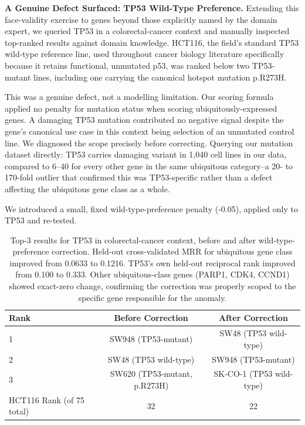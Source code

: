 \documentclass[author={Karen Coutinho, Ishaan Bhalla, Aman Raj, Dixit Kaloorani Malarmannan},
                supervisor={Dr. Daniel D'Andrea},
                degree={MSc},
                title={CellSelector Omics: A Multi-Omics Recommendation System for Cell Line Selection},
                subtitle={},
                type={},
                year={2026}]{dissertation}
\begin{document}
{\bf A Genuine Defect Surfaced: TP53 Wild-Type Preference.} Extending this face-validity exercise to genes beyond those explicitly named by the domain expert, we queried TP53 in a colorectal-cancer context and manually inspected top-ranked results against domain knowledge. HCT116, the field's standard TP53 wild-type reference line, used throughout cancer biology literature specifically because it retains functional, unmutated p53, was ranked below two TP53-mutant lines, including one carrying the canonical hotspot mutation p.R273H.

This was a genuine defect, not a modelling limitation. Our scoring formula applied no penalty for mutation status when scoring ubiquitously-expressed genes. A damaging TP53 mutation contributed no negative signal despite the gene's canonical use case in this context being selection of an unmutated control line. We diagnosed the scope precisely before correcting. Querying our mutation dataset directly: TP53 carries damaging variant in 1,040 cell lines in our data, compared to 6–40 for every other gene in the same ubiquitous category--a 20- to 170-fold outlier that confirmed this was TP53-specific rather than a defect affecting the ubiquitous gene class as a whole.



We introduced a small, fixed wild-type-preference penalty (-0.05), applied only to TP53 and re-tested.

\begin{table}[t]
\centering
\begin{tabular}{|l|c|c|}
\hline
{\bf Rank} & {\bf Before Correction} & {\bf After Correction} \\
\hline
1 & SW948 (TP53-mutant) & SW48 (TP53 wild-type) \\
2 & SW48 (TP53 wild-type) & SW948 (TP53-mutant) \\
3 & SW620 (TP53-mutant, p.R273H) & SK-CO-1 (TP53 wild-type) \\
HCT116 Rank (of 75 total) & 32 & 22 \\
\hline
\end{tabular}
\caption{Top-3 results for TP53 in colorectal-cancer context, before and after wild-type-preference correction. Held-out cross-validated MRR for ubiquitous gene class improved from 0.0633 to 0.1216. TP53's own held-out reciprocal rank improved from 0.100 to 0.333. Other ubiquitous-class genes (PARP1, CDK4, CCND1) showed exact-zero change, confirming the correction was properly scoped to the specific gene responsible for the anomaly.}
\label{tab:tp53-correction}
\end{table}
\end{document}
